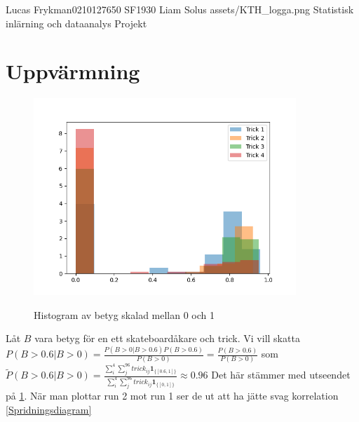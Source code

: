 \documentclass{assignment}
\newcommand{\indicator}[1]{\mathbf{1}_{\{#1\}}}
\begin{document}
\assignmentTitle
{Lucas Frykman}{0210127650}
{SF1930}
{Liam Solus}
{assets/KTH_logga.png}
{Statistisk inlärning och dataanalys}
{Projekt}


\section{Uppvärmning}



\begin{figure}[!h]
    \caption{Histogram av betyg skalad mellan 0 och 1}
    \begin{center}
        \includegraphics[width = 99mm]{assets/Figure_2.png} \label{Histogram 1}
    \end{center}
\end{figure}


Låt $B$ vara betyg för en ett skateboardåkare och trick. Vi vill skatta $P(B>0.6|B>0) = \frac{P(B>0|B>0.6)P(B>0.6)}{P(B>0)}=\frac{P(B>0.6)}{P(B>0)}$
som $\tilde{P}(B>0.6|B>0) = \frac{\sum_{i}^4\sum_{j}^{96}trick_{ij}\indicator{[0.6,1]}}{\sum_{i}^4\sum_{j}^{96}trick_{ij}\indicator{[0,1]}} \approx 0.96$
Det här stämmer med utseendet på \cref{Histogram 1}. När man plottar run 2 mot run 1 ser de ut att ha jätte svag korrelation \cref{Spridningsdiagram}
\end{document}
